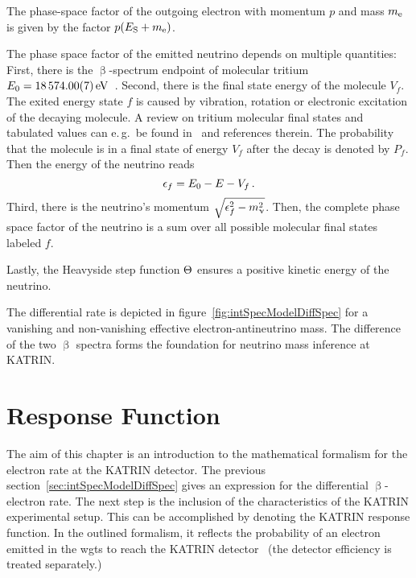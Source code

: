 The phase-space factor of the outgoing electron with momentum $p$ and mass $m_{\mathrm{e}}$ is given by the factor $p(E_\mathrm{S}+m_{\mathrm{e}})$.

The phase space factor of the emitted neutrino  depends on multiple quantities: First, there is the $\upbeta$-spectrum endpoint of molecular tritium $E_0=\SI{18574.00\pm0.07}{eV}$~\cite{Myers2015,Otten:2008zz}. Second, there is the final state energy of the molecule $V_f$. The exited energy state $f$ is caused by vibration, rotation or electronic excitation of the decaying molecule. A review on tritium molecular final states and tabulated values can e.\,g.~be found in~\cite{Bodine2015} and references therein. The probability that the molecule is in a final state of energy $V_f$ after the decay is denoted by $P_f$. Then the energy of the neutrino reads 
\begin{equation}
\label{eq:intSpecModelDiffSpecNeutrinoEnergy}
\epsilon_f = E_0 - E - V_f 
\text{\,.}
\end{equation}
Third, there is the neutrino's momentum $\sqrt{\epsilon_f^2-m_\upnu^2}$. Then, the complete phase space factor of the neutrino is a sum over all possible molecular final states labeled $f$.

Lastly, the Heavyside step function $\Theta$ ensures a positive kinetic energy of the neutrino.

The differential rate is depicted in figure~\ref{fig:intSpecModelDiffSpec} for a vanishing and non-vanishing effective electron-antineutrino mass. The difference of the two $\upbeta$ spectra forms the foundation for neutrino mass inference at KATRIN.

\section{Response Function}
\label{sec:intSpecModelResponse}
The aim of this chapter is an introduction to the mathematical formalism for the electron rate at the KATRIN detector. The previous section~\ref{sec:intSpecModelDiffSpec} gives an expression for the differential $\upbeta$-electron rate. The next step is the inclusion of the characteristics of the KATRIN experimental setup. This can be accomplished by denoting the KATRIN response function. In the outlined formalism, it reflects the probability of an electron emitted in the \gls{wgts} to reach the KATRIN detector~\cite{Groh2015} (the detector efficiency is treated separately.)

